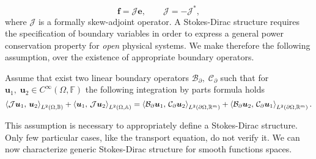 \begin{equation}\label{eq:stdir}
\bm{f} =\mathcal{J}\bm{e}, \qquad \mathcal{J}= -\mathcal{J}^*,
\end{equation}
where $\mathcal{J}$ is a formally skew-adjoint operator. A Stokes-Dirac structure requires the specification of boundary variables in order to express a general power  conservation  property  for \textit{open} physical  systems. We make therefore the following assumption, over the existence of appropriate boundary operators.

\begin{assumption}
	\label{ass:bdoper}
	Assume that exist two linear boundary operators $\mathcal{B}_\partial, \; \mathcal{C}_\partial$ such that for $\bm{u}_1, \; \bm{u}_2 \in C^\infty(\Omega, \mathbb{F})$ the following integration by parts formula holds
	\begin{equation}\label{eq:intbypartsJ}
	\inner[L^2(\Omega, \bbB)]{\mathcal{J}\bm{u}_1}{\bm{u}_2} + \inner[L^2(\Omega, \bbA)]{\bm{u}_1}{\mathcal{J}\bm{u}_2} = \inner[L^2(\partial\Omega, \bbR^m)]{\mathcal{B}_\partial \bm{u}_1}{\mathcal{C}_\partial \bm{u}_2} + \inner[L^2(\partial\Omega, \bbR^m)]{\mathcal{B}_\partial \bm{u}_2}{\mathcal{C}_\partial \bm{u}_1}.
	\end{equation}

\end{assumption}

This assumption is necessary to appropriately define a Stokes-Dirac structure. Only few particular cases, like the transport equation, do not verify it. We can now characterize generic Stokes-Dirac structure for smooth functions spaces.

